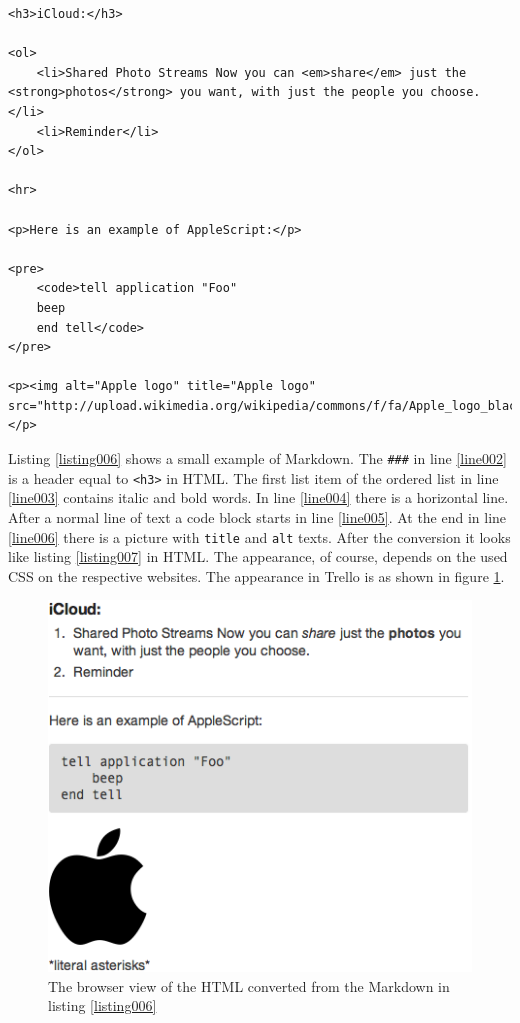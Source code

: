 \begin{lstlisting}[aboveskip=1\baselineskip, style=html, caption=Listing \ref{listing006} converted to HTML., label=listing007]
<h3>iCloud:</h3>

<ol>
	<li>Shared Photo Streams Now you can <em>share</em> just the <strong>photos</strong> you want, with just the people you choose.</li>
	<li>Reminder</li>
</ol>

<hr>

<p>Here is an example of AppleScript:</p>

<pre>
	<code>tell application "Foo"
	beep
	end tell</code>
</pre>

<p><img alt="Apple logo" title="Apple logo" src="http://upload.wikimedia.org/wikipedia/commons/f/fa/Apple_logo_black.svg"></p>
\end{lstlisting} 

Listing \ref{listing006} shows a small example of Markdown. The \lstinline{###} in line \ref{line002} is a header equal to \lstinline{<h3>} in HTML. The first list item of the ordered list in line \ref{line003} contains italic and bold words. In line \ref{line004} there is a horizontal line. After a normal line of text a code block starts in line \ref{line005}. At the end in line \ref{line006} there is a picture with \lstinline{title} and \lstinline{alt} texts. After the conversion it looks like listing \ref{listing007} in HTML. The appearance, of course, depends on the used CSS on the respective websites. The appearance in Trello is as shown in figure \ref{fig:markdown-result}.

\begin{figure}[htb]
\centering
\includegraphics[scale=0.6]{figures/markdown-result}
\caption{The browser view of the HTML converted from the Markdown in listing \ref{listing006}}
\label{fig:markdown-result}
\end{figure}


